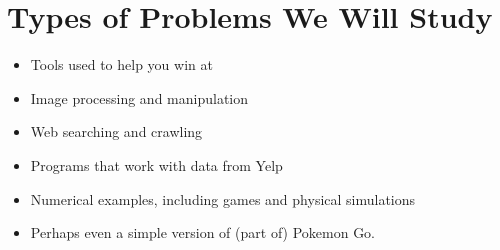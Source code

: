 \documentclass[letterpaper,10pt,english]{sphinxmanual}
\begin{document}
\section{Types of Problems We Will Study}
\label{\detokenize{lecture_notes/lec01_intro:types-of-problems-we-will-study}}\begin{itemize}
\item {} 
Tools used to help you win at 

\item {} 
Image processing and manipulation

\item {} 
Web searching and crawling

\item {} 
Programs that work with data from Yelp

\item {} 
Numerical examples, including games and physical simulations

\item {} 
Perhaps even a simple version of (part of) Pokemon Go.

\end{itemize}
\end{document}
